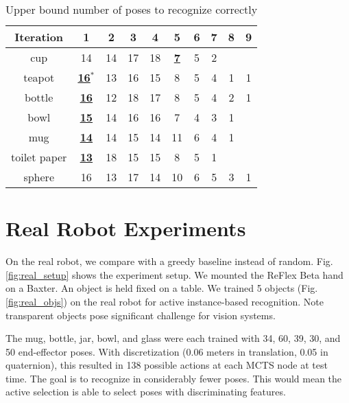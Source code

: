 \documentclass[letterpaper, 10 pt, conference]{ieeeconf}  %
\begin{document}
\begin{table}[thbp]
  \begin{center}
  \begin{tabulary}{.8\linewidth}{c | c c c c c c c c c}
   Iteration &  1 &  2 &  3 &  4 &  5 & 6 & 7 & 8 & 9 \\ \hline
         cup & 14 & 14 & 17 & 18 &  \underline{\textbf{7}} & 5 & 2 & & \\
      teapot & \underline{\textbf{16$^*$}} & 13 & 16 & 15 &  8 & 5 & 4 & 1 & 1 \\
      bottle & \underline{\textbf{16}} & 12 & 18 & 17 &  8 & 5 & 4 & 2 & 1 \\
        bowl & \underline{\textbf{15}} & 14 & 16 & 16 &  7 & 4 & 3 & 1 & \\
         mug & \underline{\textbf{14}} & 14 & 15 & 14 & 11 & 6 & 4 & 1 & \\
toilet paper & \underline{\textbf{13}} & 18 & 15 & 15 &  8 & 5 & 1 & & \\
      sphere & 16 & 13 & 17 & 14 & 10 & 6 & 5 & 3 & 1
  \end{tabulary}
  \caption{\label{tab:moves} Upper bound number of poses to recognize correctly}
  \end{center}
  \vspace{-5mm}
\end{table}




\section{Real Robot Experiments}


On the real robot, we compare with a greedy baseline instead of random.
Fig. \ref{fig:real_setup} shows the experiment setup.
We mounted the ReFlex Beta hand on a Baxter. 
An object is held fixed on a table. 
We trained 5 objects (Fig. \ref{fig:real_objs}) on the real robot for active instance-based recognition. Note transparent objects pose significant challenge for vision systems.

The mug, bottle, jar, bowl, and glass were each trained with 34, 60, 39, 30, and 50 end-effector poses.
With discretization (0.06 meters in translation, 0.05 in quaternion), this resulted in 138 possible actions at each MCTS node at test time.
The goal is to recognize in considerably fewer poses. This would mean the active selection is able to select poses with discriminating features.
\end{document}
